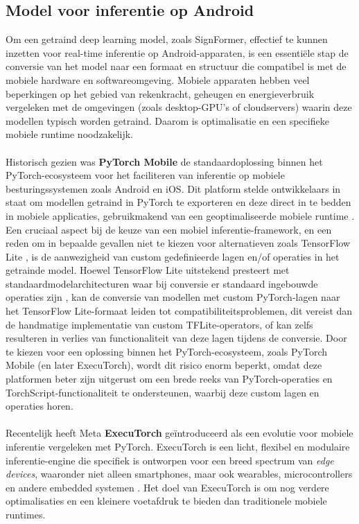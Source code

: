\subsection{Model voor inferentie op Android}
\label{subsec:model-inferentie-android}

Om een getraind deep learning model, zoals SignFormer, effectief te kunnen inzetten voor real-time inferentie op Android-apparaten, is een essentiële stap de conversie van het model naar een formaat en structuur die compatibel is met de mobiele hardware en softwareomgeving.
Mobiele apparaten hebben veel beperkingen op het gebied van rekenkracht, geheugen en energieverbruik vergeleken met de omgevingen (zoals desktop-GPU's of cloudservers) waarin deze modellen typisch worden getraind.
Daarom is optimalisatie en een specifieke mobiele runtime noodzakelijk.
\\
\\
Historisch gezien was \textbf{PyTorch Mobile} de standaardoplossing binnen het PyTorch-ecosysteem voor het faciliteren van inferentie op mobiele besturingssystemen zoals Android en iOS.
Dit platform stelde ontwikkelaars in staat om modellen getraind in PyTorch te exporteren en deze direct in te bedden in mobiele applicaties, gebruikmakend van een geoptimaliseerde mobiele runtime \autocite{paszke2019pytorch}.
Een cruciaal aspect bij de keuze van een mobiel inferentie-framework, en een reden om in bepaalde gevallen niet te kiezen voor alternatieven zoals TensorFlow Lite \autocite{tensorflow_lite}, is de aanwezigheid van  custom gedefinieerde lagen en/of operaties in het getrainde model.
Hoewel TensorFlow Lite uitstekend presteert met standaardmodelarchitecturen waar bij conversie er standaard ingebouwde operaties zijn \autocite{tflite_ops}, kan de conversie van modellen met custom PyTorch-lagen naar het TensorFlow Lite-formaat leiden tot compatibiliteitsproblemen, dit vereist dan de handmatige implementatie van custom TFLite-operators, of kan zelfs resulteren in verlies van functionaliteit van deze lagen tijdens de conversie.
Door te kiezen voor een oplossing binnen het PyTorch-ecosysteem, zoals PyTorch Mobile (en later ExecuTorch), wordt dit risico enorm beperkt, omdat deze platformen beter zijn uitgerust om een brede reeks van PyTorch-operaties en TorchScript-functionaliteit te ondersteunen, waarbij deze custom lagen en operaties horen.
\\
\\
Recentelijk heeft Meta \textbf{ExecuTorch} geïntroduceerd als een evolutie voor mobiele inferentie vergeleken met PyTorch.
ExecuTorch is een licht, flexibel en modulaire inferentie-engine die specifiek is ontworpen voor een breed spectrum van \textit{edge devices}, waaronder niet alleen smartphones, maar ook wearables, microcontrollers en andere embedded systemen \autocite{executorch2023}.
Het doel van ExecuTorch is om nog verdere optimalisaties en een kleinere voetafdruk te bieden dan traditionele mobiele runtimes.

